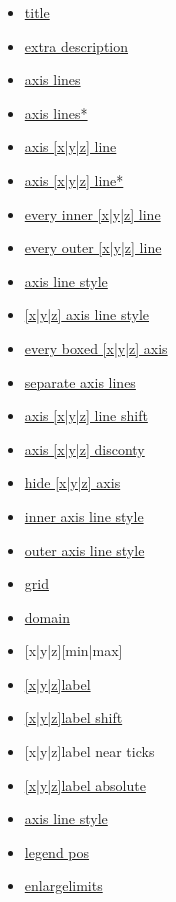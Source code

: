 \begin{multicols}{2}
{\footnotesize \color{blue}
\begin{itemize}[leftmargin=1mm,label={}]
    \item \href{\docurl\#pgfp./pgfplots/title}{title}
    \item \href{\docurl\#pgfp./pgfplots/extra:description}{extra description}
    \item \href{\docurl\#pgfp./pgfplots/axis:lines}{axis lines}
    \item \href{\docurl\#pgfp./pgfplots/axis:lines}{axis lines*}
    \item \href{\docurl\#pgfp./pgfplots/axis:x:line}{axis [x|y|z] line}
    \item \href{\docurl\#pgfp./pgfplots/axis:x:line*}{axis [x|y|z] line*}
    \item \href{\docurl\#pgfp./pgfplots/every:inner:x:axis:line}{every inner [x|y|z] line}
    \item \href{\docurl\#pgfp./pgfplots/every:outer:x:axis:line}{every outer [x|y|z] line}
    \item \href{\docurl\#pgfp./pgfplots/axis:line:style}{axis line style}
    \item \href{\docurl\#pgfp./pgfplots/x:axis:line:style}{{[x|y|z]} axis line style}
    \item \href{\docurl\#pgfp./pgfplots/every:boxed:x:axis}{every boxed [x|y|z] axis}
    \item \href{\docurl\#pgfp./pgfplots/separate:axis:lines}{separate axis lines}
    \item \href{\docurl\#pgfp./pgfplots/axis:x:line:shift}{axis [x|y|z] line shift}
    \item \href{\docurl\#pgfp./pgfplots/axis:x:discontinuity}{axis [x|y|z] discont\textquotesingle y}
    \item \href{\docurl\#pgfp./pgfplots/hide:x:axis}{hide [x|y|z] axis}
    \item \href{\docurl\#pgfp./pgfplots/inner:axis:line:style}{inner axis line style}
    \item \href{\docurl\#pgfp./pgfplots/outer:axis:line:style}{outer axis line style}
    \item \href{\docurl\#pgfp./pgfplots/grid}{grid}
    \item \href{\docurl\#pgfp./pgfplots/domain}{domain}
    \item {[x|y|z]}[min|max]
    \item \href{\docurl\#pgfp./pgfplots/xlabel}{{[x|y|z]}label}
    \item \href{\docurl\#pgfp./pgfplots/label:shift}{{[x|y|z]}label shift}
    \item {[x|y|z]}label near ticks
    \item \href{\docurl\#pgfp./pgfplots/xlabel:absolute}{{[x|y|z]}label absolute}
    \item \href{\docurl\#pgfp./pgfplots/axis:line:style}{\footnotesize axis line style}
    \item \href{\docurl\#pgfp./pgfplots/legend:pos}{legend pos}
    \item \href{\docurl\#pgfp./pgfplots/enlargelimits}{enlargelimits}
\end{itemize}
}
\end{multicols}

